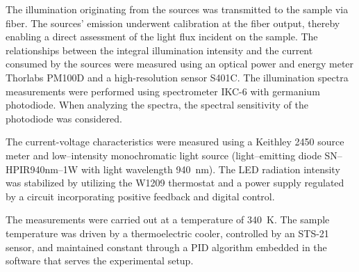 \documentclass{WileyMSP-template}
\begin{document}
The illumination originating from the sources was transmitted to the sample via fiber.
The sources' emission underwent calibration at the fiber output, 
thereby enabling a direct assessment of the light flux incident on the sample.
The relationships between the integral illumination intensity 
and the current consumed by the sources were measured using an optical power and energy meter Thorlabs PM100D and a high-resolution sensor S401C.
The illumination spectra measurements were performed using spectrometer IKC-6 with germanium photodiode.
When analyzing the spectra, the spectral sensitivity of the photodiode was considered.

The current-voltage characteristics were measured using a Keithley 2450 source meter and 
low--intensity monochromatic light source (light--emitting diode SN--HPIR940nm--1W with light wavelength 940~nm).
The LED radiation intensity was stabilized by utilizing the W1209 thermostat and a power supply regulated by a circuit incorporating positive feedback and digital control.

The measurements were carried out at a temperature of 340~K. 
The sample temperature was driven by a thermoelectric cooler, 
controlled by an STS-21 sensor, 
and maintained constant through a PID algorithm embedded in the software that serves the experimental setup.



%
\end{document}
